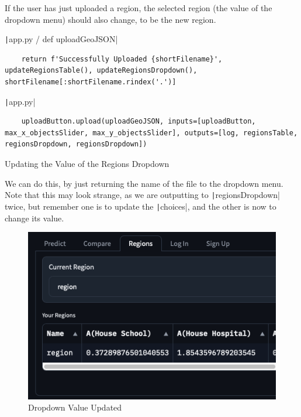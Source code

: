 \documentclass[12pt]{report}
\newcommand{\pil}[1]{\protect\texttt|#1|}
\begin{document}
\begin{center}
\end{center}

If the user has just uploaded a region, the selected region (the value of the dropdown menu) should also change, to be the new region.

\begin{listing}[H]
\pil{app.py / def uploadGeoJSON}
\begin{verbatim}
    return f'Successfully Uploaded {shortFilename}', updateRegionsTable(), updateRegionsDropdown(), shortFilename[:shortFilename.rindex('.')]
\end{verbatim}
\pil{app.py}
\begin{verbatim}
    uploadButton.upload(uploadGeoJSON, inputs=[uploadButton, max_x_objectsSlider, max_y_objectsSlider], outputs=[log, regionsTable, regionsDropdown, regionsDropdown])
\end{verbatim}
\caption{Updating the Value of the Regions Dropdown}\label{cs:updateRegionsDropdownValue}
\end{listing}

We can do this, by just returning the name of the file to the dropdown menu. Note that this may look strange, as we are outputting to \pil{regionsDropdown} twice, but remember one is to update the \pil{choices}, and the other is now to change its value.

\begin{figure}[H]
\centering
\includegraphics[width=13cm]{ss20.6.png}
\caption{Dropdown Value Updated}\label{fig:ss20.6}
\end{figure}
\end{document}
